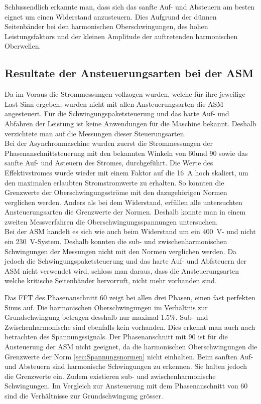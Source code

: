 Schlussendlich erkannte man, dass sich das sanfte Auf- und Absteuern am besten eignet um einen Widerstand anzusteuern. Dies Aufgrund der dünnen Seitenbänder bei den harmonischen Oberschwingungen, des hohen Leistungsfaktors und der kleinen Amplitude der auftretenden harmonischen Oberwellen.

\subsection{Resultate der Ansteuerungsarten bei der ASM}
Da im Voraus die Strommessungen vollzogen wurden, welche für ihre jeweilige Last Sinn ergeben, wurden nicht mit allen Ansteuerungsarten die ASM angesteuert. Für die Schwingungspaketsteuerung und das harte Auf- und Abfahren der Leistung ist keine Anwendungen für die Maschine bekannt. Deshalb verzichtete man auf die Messungen dieser Steuerungsarten.\\


Bei der Asynchronmaschine wurden zuerst die Strommessungen der Phasenanschnittsteuerung mit den bekannten Winkeln von 60\textdegree und 90\textdegree \hspace{0.02cm} sowie das sanfte Auf- und Asteuern des Stromes, durchgeführt. Die Werte des Effektivstromes wurde wieder mit einem Faktor auf die \SI{16}{A} hoch skaliert, um den maximalen erlaubten Stromstromwerte zu erhalten. So konnten die Grenzwerte der Oberschwingungsströme mit den dazugehörigen Normen verglichen werden. Anders als bei dem Widerstand, erfüllen alle untersuchten Ansteuerungsarten die Grenzwerte der Normen. Deshalb konnte man in einem zweiten Messverfahren die Oberschwingungsspannungen untersuchen.\\

Bei der ASM handelt es sich wie auch beim Widerstand um ein \SI{400}{V}- und nicht ein \SI{230}{V}-System. Deshalb konnten die sub- und zwischenharmonischen Schwingungen der Messungen nicht mit den Normen verglichen werden.
Da jedoch die Schwingungspaketsteuerung und das harte Auf- und Abfsteuern der ASM nicht verwendet wird, schloss man daraus, dass die Ansteuerungsarten welche kritische Seitenbänder hervorruft, nicht mehr vorhanden sind. 

Das FFT des Phasenanschnitt 60\textdegree \hspace{0.02cm} zeigt bei allen drei Phasen, einen fast perfekten Sinus auf.
Die harmonischen Oberschwingungen im Verhältnis zur Grundschwingung betragen desshalb nur maximal 1.5\%. Sub- und Zwischenharmonische sind ebenfalls kein vorhanden. Dies erkennt man auch nach betrachten des Spannungssignals.
Der Phasenanschnitt mit 90\textdegree \hspace{0.02cm} ist für die Ansteuerung der ASM nicht geeignet, da die harmonischen Oberschwingungen die Grenzwerte der Norm \ref{sec:Spannungsnormen} nicht einhalten. 
Beim sanften Auf- und Absteuern sind harmonische Schwingungen zu erkennen. Sie halten jedoch die Grenzwerte ein. Zudem existieren sub- und zwischenharmonische Schwingungen. Im Vergleich zur Ansteuerung mit dem Phasenanschnitt von 60\textdegree \hspace{0.02cm} sind die Verhältnisse zur Grundschwingung grösser.\\ 

